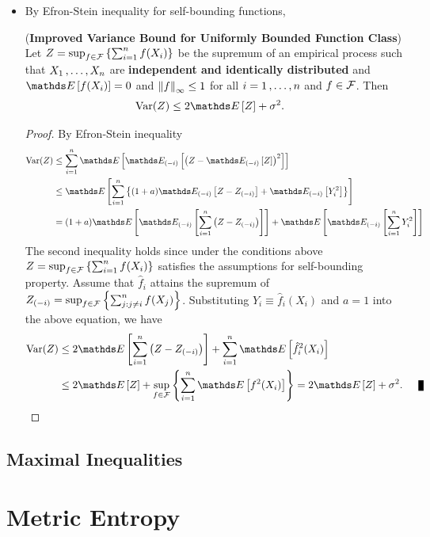 \documentclass[11pt]{article}
\begin{document}
\begin{itemize}
\item By Efron-Stein inequality for self-bounding functions, 
\begin{theorem} (\textbf{Improved Variance Bound for Uniformly Bounded Function Class}) \citep{boucheron2013concentration}\\
Let $Z =  \sup_{f \in {\mathcal F}}\left\{\sum_{i=1}^n f(X_i)\right\}$  be the supremum of an empirical process such that $X_1 \,{,}\ldots{,}\, X_n$ are \textbf{independent and identically distributed} and $\E{}{f(X_i)} =0$  and $\left\|f\right\|_{\infty} \le 1$ for all $i = 1 \,{,}\ldots{,}\, n$ and $f \in {\mathcal F}$. Then
\begin{align}
\text{Var}(Z) &\le  2\E{}{Z} +\sigma^2. \label{ineqn: variance_bound_by_weak_2}
\end{align}
\end{theorem}
\begin{proof}
By Efron-Stein inequality
\begin{align*}
\text{Var}(Z) &\le \sum_{i=1}^{n}\E{}{\E{(-i)}{\paren{Z- \E{(-i)}{Z}}^2}}\\
&\le \E{}{\sum_{i=1}^{n}\set{(1 + a) \E{(-i)}{Z - Z_{(-i)}} + \E{(-i)}{Y_i^2}}}\\
&= (1 + a)\E{}{\E{(-i)}{\sum_{i=1}^{n}\paren{Z - Z_{(-i)}}}} + \E{}{\E{(-i)}{\sum_{i=1}^{n}Y_i^2}}
\end{align*} The second inequality holds since under the conditions above $Z = \sup_{f \in {\mathcal F}}\left\{\sum_{i=1}^n f(X_i)\right\}$ satisfies the assumptions for self-bounding property.  Assume that  $\hat{f}_i$ attains the supremum of $Z_{(-i)} = \sup_{f \in {\mathcal F}}\left\{\sum_{j: j\neq i}^n f(X_j)\right\}$. Substituting $Y_i \equiv \hat{f}_i(X_i)$ and $a = 1$ into the above equation, we have
\begin{align*}
\text{Var}(Z) &\le 2\E{}{\sum_{i=1}^{n}\paren{Z - Z_{(-i)}}} + \sum_{i=1}^{n}\E{}{\hat{f}_i^2 (X_i)} \\
&\le 2\E{}{Z} + \sup_{f \in \cF}\set{\sum_{i=1}^{n}\E{}{f^2 (X_i)}} = 2\E{}{Z} + \sigma^2. \qed
\end{align*}
\end{proof}
\end{itemize}
\subsection{Maximal Inequalities}

\section{Metric Entropy}
\end{document}
